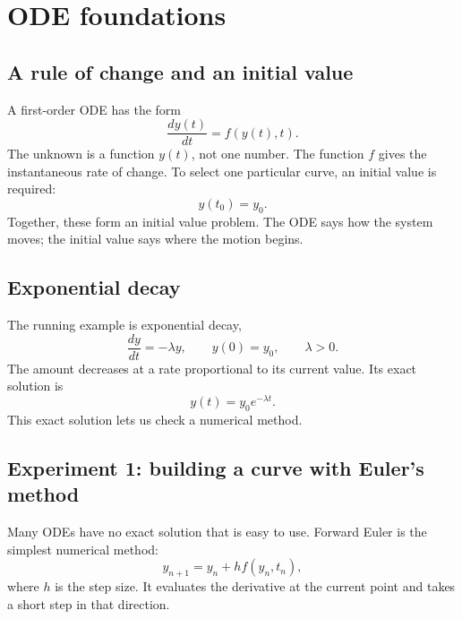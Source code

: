 \documentclass[11pt,a4paper]{article}
\begin{document}
\section{ODE foundations}

\subsection{A rule of change and an initial value}

A first-order ODE has the form
\begin{equation}
\frac{dy(t)}{dt}=f(y(t),t).
\label{eq:ode}
\end{equation}
The unknown is a function $y(t)$, not one number. The function $f$ gives the
instantaneous rate of change. To select one particular curve, an initial value
is required:
\begin{equation}
y(t_0)=y_0.
\label{eq:initial}
\end{equation}
Together, these form an initial value problem. The ODE says how the system
moves; the initial value says where the motion begins.

\subsection{Exponential decay}

The running example is exponential decay,
\begin{equation}
\frac{dy}{dt}=-\lambda y,\qquad y(0)=y_0,\qquad\lambda>0.
\label{eq:decay}
\end{equation}
The amount decreases at a rate proportional to its current value. Its exact
solution is
\begin{equation}
y(t)=y_0e^{-\lambda t}.
\label{eq:decay_solution}
\end{equation}
This exact solution lets us check a numerical method.

\subsection{Experiment 1: building a curve with Euler's method}

Many ODEs have no exact solution that is easy to use. Forward Euler is the
simplest numerical method:
\begin{equation}
y_{n+1}=y_n+h f(y_n,t_n),
\label{eq:euler}
\end{equation}
where $h$ is the step size. It evaluates the derivative at the current point
and takes a short step in that direction.
\end{document}
